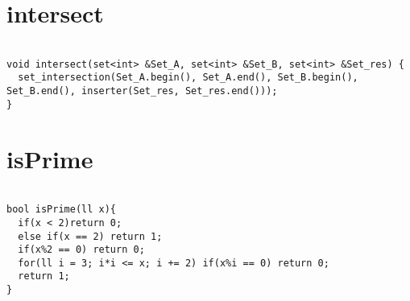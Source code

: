 \documentclass{jsarticle}
\begin{document}
\color{white}
\section{intersect}
\color{black}
\begin{lstlisting}[caption=intersect]

void intersect(set<int> &Set_A, set<int> &Set_B, set<int> &Set_res) {
  set_intersection(Set_A.begin(), Set_A.end(), Set_B.begin(), Set_B.end(), inserter(Set_res, Set_res.end()));
}

\end{lstlisting}

\color{white}
\section{isPrime}
\color{black}
\begin{lstlisting}[caption=isPrime]

bool isPrime(ll x){
  if(x < 2)return 0;
  else if(x == 2) return 1;
  if(x%2 == 0) return 0;
  for(ll i = 3; i*i <= x; i += 2) if(x%i == 0) return 0;
  return 1;
}

\end{lstlisting}

\color{white}
\end{document}
